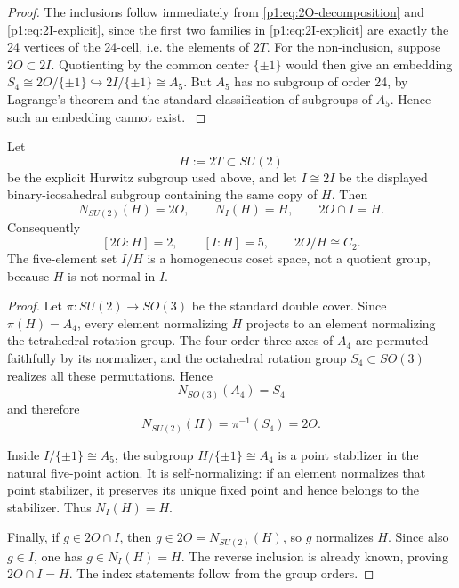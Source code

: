\documentclass[11pt]{article}
\begin{document}
\begin{proof}
The inclusions follow immediately from \eqref{p1:eq:2O-decomposition} and
\eqref{p1:eq:2I-explicit}, since the first two families in
\eqref{p1:eq:2I-explicit} are exactly the 24 vertices of the 24-cell, i.e.
the elements of $2T$. For the non-inclusion, suppose $2O \subset 2I$. Quotienting
by the common center $\{\pm1\}$ would then give an embedding
$S_4 \cong 2O/\{\pm1\} \hookrightarrow 2I/\{\pm1\} \cong A_5$. But $A_5$ has no
subgroup of order 24, by Lagrange's theorem and the standard classification of
subgroups of $A_5$. Hence such an embedding cannot exist.
\cite{conwaysmith2003quaternions,wolf2011spaces}
\end{proof}

\begin{theorem}
\label{p1:thm:exceptional-normalizer-fork}
Let
\[
    H:=2T\subset SU(2)
\]
be the explicit Hurwitz subgroup used above, and let
\(I\cong2I\) be the displayed binary-icosahedral subgroup containing the same
copy of \(H\).  Then
\[
    N_{SU(2)}(H)=2O,
    \qquad
    N_I(H)=H,
    \qquad
    2O\cap I=H.
\]
Consequently
\[
    [2O:H]=2,
    \qquad
    [I:H]=5,
    \qquad
    2O/H\cong C_2.
\]
The five-element set \(I/H\) is a homogeneous coset space, not a quotient
group, because \(H\) is not normal in \(I\).
\end{theorem}

\begin{proof}
Let \(\pi:SU(2)\to SO(3)\) be the standard double cover.  Since
\(\pi(H)=A_4\), every element normalizing \(H\) projects to an element
normalizing the tetrahedral rotation group.  The four order-three axes of
\(A_4\) are permuted faithfully by its normalizer, and the octahedral rotation
group \(S_4\subset SO(3)\) realizes all these permutations.  Hence
\[
    N_{SO(3)}(A_4)=S_4
\]
and therefore
\[
    N_{SU(2)}(H)=\pi^{-1}(S_4)=2O.
\]

Inside \(I/\{\pm1\}\cong A_5\), the subgroup
\(H/\{\pm1\}\cong A_4\) is a point stabilizer in the natural five-point
action.  It is self-normalizing: if an element normalizes that point stabilizer,
it preserves its unique fixed point and hence belongs to the stabilizer.  Thus
\(N_I(H)=H\).

Finally, if \(g\in2O\cap I\), then \(g\in2O=N_{SU(2)}(H)\), so \(g\)
normalizes \(H\).  Since also \(g\in I\), one has
\(g\in N_I(H)=H\).  The reverse inclusion is already known, proving
\(2O\cap I=H\).  The index statements follow from the group orders.
\end{proof}
\end{document}
